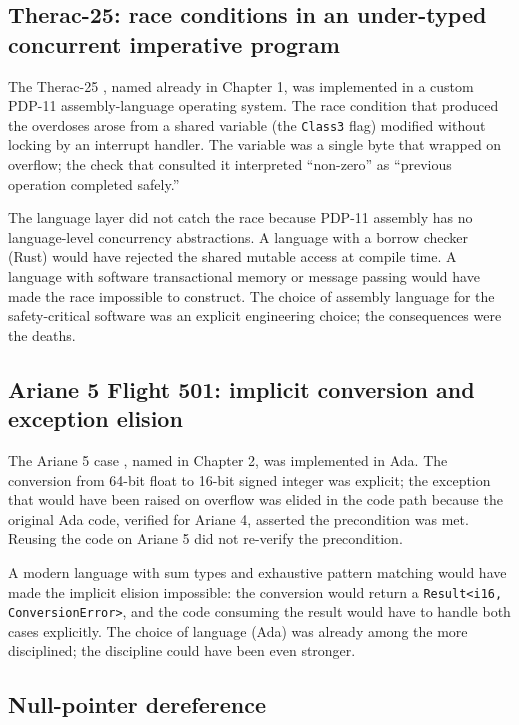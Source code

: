 \subsection{Therac-25: race conditions in an under-typed concurrent imperative program}

The Therac-25 \cite{paper:leveson-turner1993}, named already in Chapter 1, was implemented in a custom PDP-11 assembly-language operating system. The race condition that produced the overdoses arose from a shared variable (the \texttt{Class3} flag) modified without locking by an interrupt handler. The variable was a single byte that wrapped on overflow; the check that consulted it interpreted ``non-zero'' as ``previous operation completed safely.''

The language layer did not catch the race because PDP-11 assembly has no language-level concurrency abstractions. A language with a borrow checker (Rust) would have rejected the shared mutable access at compile time. A language with software transactional memory or message passing would have made the race impossible to construct. The choice of assembly language for the safety-critical software was an explicit engineering choice; the consequences were the deaths.

\subsection{Ariane 5 Flight 501: implicit conversion and exception elision}

The Ariane 5 case \cite{acc:ariane501-ifr}, named in Chapter 2, was implemented in Ada. The conversion from 64-bit float to 16-bit signed integer was explicit; the exception that would have been raised on overflow was elided in the code path because the original Ada code, verified for Ariane 4, asserted the precondition was met. Reusing the code on Ariane 5 did not re-verify the precondition.

A modern language with sum types and exhaustive pattern matching would have made the implicit elision impossible: the conversion would return a \texttt{Result<i16, ConversionError>}, and the code consuming the result would have to handle both cases explicitly. The choice of language (Ada) was already among the more disciplined; the discipline could have been even stronger.

\subsection{Null-pointer dereference}


